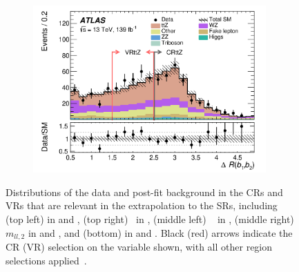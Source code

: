 \begin{figure}
\begin{subfigure}[b]{0.49\textwidth}
      \includegraphics[width=0.98\textwidth]{figs/rpvthreel/CRttZ_Nm1_mydRbb.png}
      \caption{}
      \label{fig:Nminus1CRttZ}
    \end{subfigure}
    \caption[Distributions of the data and post-fit background in the CRs and VRs that are relevant in the extrapolation to the SRs (\mTmin in \CRWZ and \VRmTmin, \MET\ in \CRWZ, \MET\ in \VRmet, $m_{ll,2}$ in \CRZZ and \VRZZ, and \dRbb\ in \CRttZ and \VRttZ)]{Distributions of the data and post-fit background in the CRs and VRs that are relevant in the extrapolation to the SRs, including (top left) \mTmin in \CRWZ and \VRmTmin, (top right) \MET\ in \CRWZ, (middle left) \MET~ in \VRmet, (middle right) $m_{ll,2}$ in \CRZZ and \VRZZ, and (bottom) \dRbb in \CRttZ and \VRttZ. Black (red) arrows indicate the CR (VR) selection on the variable shown, with all other region selections applied~\cite{ATLAS:2020uer}.}
    \label{fig:postfitkinematics}
\end{figure}

